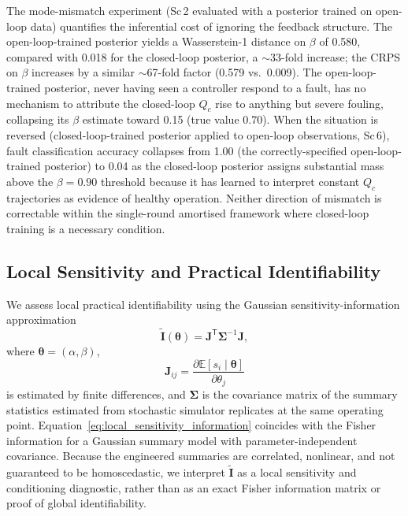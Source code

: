 \documentclass[aps,pre,twocolumn,superscriptaddress,floatfix]{revtex4-2}
\begin{document}
\label{sec:model_mismatch_results}
The mode-mismatch experiment (Sc\,2 evaluated with a posterior trained on
open-loop data) quantifies the inferential cost of ignoring the feedback
structure.  The open-loop-trained posterior yields a Wasserstein-1 distance
on $\beta$ of 0.580, compared with 0.018 for the closed-loop posterior,
a $\sim$33-fold increase; the CRPS on $\beta$ increases by a similar
$\sim$67-fold factor (0.579 vs.\ 0.009).  The open-loop-trained posterior,
never having seen a controller respond to a fault, has no mechanism to
attribute the closed-loop $Q_c$ rise to anything but severe fouling, collapsing
its $\beta$ estimate toward 0.15 (true value 0.70).  When the
situation is reversed (closed-loop-trained posterior applied to open-loop
observations, Sc\,6), fault classification accuracy collapses from 1.00 (the
correctly-specified open-loop-trained posterior) to 0.04 as the closed-loop
posterior assigns substantial mass above the $\beta = 0.90$
threshold because it has learned to interpret constant $Q_c$ trajectories
as evidence of healthy operation.  Neither direction of mismatch is
correctable within the single-round amortised framework where closed-loop training
is a necessary condition.

\subsection{Local Sensitivity and Practical Identifiability} \label{sec:identifiability} 
We assess local practical identifiability using the Gaussian sensitivity-information approximation
\begin{equation}
  \widetilde{\mathbf{I}}(\boldsymbol{\theta})
  = \mathbf{J}^{\mathsf{T}} \boldsymbol{\Sigma}^{-1} \mathbf{J},
  \label{eq:local_sensitivity_information}
\end{equation}
where $\boldsymbol{\theta}=(\alpha,\beta)$,
\begin{equation}
  \mathbf{J}_{ij}
  = \frac{\partial \mathbb{E}[s_i\mid\boldsymbol{\theta}]}{\partial\theta_j}
\end{equation}
is estimated by finite differences, and $\boldsymbol{\Sigma}$ is the covariance matrix of the 
summary statistics estimated from stochastic simulator replicates at the same operating point. 
Equation~\eqref{eq:local_sensitivity_information} coincides with the Fisher information for a 
Gaussian summary model with parameter-independent covariance. Because the engineered summaries 
are correlated, nonlinear, and not guaranteed to be homoscedastic, we interpret $\widetilde{\mathbf{I}}$ 
as a local sensitivity and conditioning diagnostic, rather than as an exact Fisher information 
matrix or proof of global identifiability.
\end{document}
